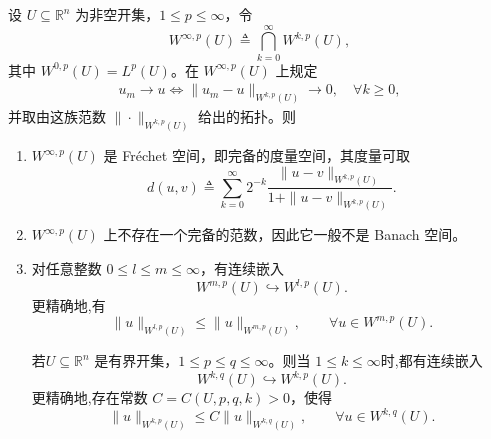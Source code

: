 \documentclass[../../main.tex]{subfiles}
\begin{document}
\begin{proposition}\label{proposition:ch05-Winftyp}
设 \(U\subseteq\mathbb{R}^{n}\) 为非空开集，\(1\leqslant p\leqslant\infty\)，令
\[
W^{\infty,p}(U)\triangleq\bigcap_{k=0}^{\infty}W^{k,p}(U),
\]
其中 \(W^{0,p}(U)=L^{p}(U)\)。在 \(W^{\infty,p}(U)\) 上规定
\begin{align}
u_m\to u
\iff
\|u_m-u\|_{W^{k,p}(U)}\to0,\quad \forall k\geqslant0,\label{eqHJNZMZNZMZZZ}
\end{align}
并取由这族范数 \(\|\cdot\|_{W^{k,p}(U)}\) 给出的拓扑。则
\begin{enumerate}[(1)]
\item\label{proposition:ch05-Winftyp-1} \(W^{\infty,p}(U)\) 是 Fréchet 空间，即完备的度量空间，其度量可取
\[
d(u,v)\triangleq
\sum_{k=0}^{\infty}2^{-k}
\frac{\|u-v\|_{W^{k,p}(U)}}{1+\|u-v\|_{W^{k,p}(U)}}.
\]

\item\label{proposition:ch05-Winftyp-2} \(W^{\infty,p}(U)\) 上不存在一个完备的范数，因此它一般不是 Banach 空间。

\item\label{proposition:ch05-Winftyp-3} 对任意整数 \(0\leqslant l\leqslant m\leqslant \infty\)，有连续嵌入
\[
W^{m,p}(U)\hookrightarrow W^{l,p}(U).
\]
更精确地,有
\[
\|u\|_{W^{l,p}(U)}
\leqslant
\|u\|_{W^{m,p}(U)},
\qquad
\forall u\in W^{m,p}(U).
\]

若\(U\subseteq\mathbb R^n\) 是有界开集，\(1\leqslant p\leqslant q\leqslant\infty\)。则当
$1\leqslant k\leqslant \infty$时,都有连续嵌入
\[
W^{k,q}(U)\hookrightarrow W^{k,p}(U).
\]
更精确地,存在常数 \(C=C(U,p,q,k)>0\)，使得
\[
\|u\|_{W^{k,p}(U)}
\leqslant
C\|u\|_{W^{k,q}(U)},
\qquad
\forall u\in W^{k,q}(U).
\]
\end{enumerate}
\end{proposition}
\end{document}

